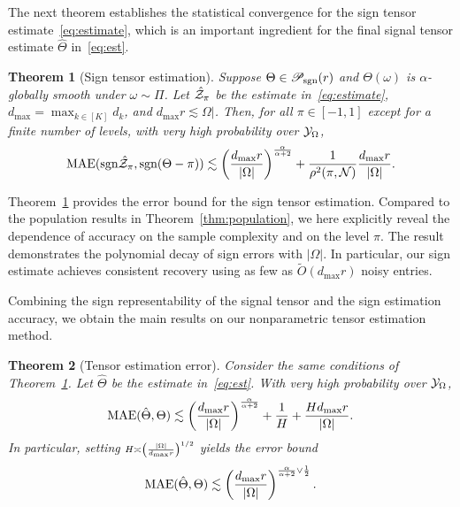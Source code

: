 \documentclass[11pt]{article}
\theoremstyle{plain}
\newtheorem{thm}{Theorem}
\theoremstyle{definition}
\def\sign{\textup{sgn}}
\def\caliP{\mathscr{P}_{\textup{sgn}}}
\begin{document}
The next theorem establishes the statistical convergence for the sign tensor estimate~\eqref{eq:estimate}, which is an important ingredient for the final signal tensor estimate $\hat \Theta$ in~\eqref{eq:est}. \\

 \begin{thm}[Sign tensor estimation]\label{thm:classification} Suppose $\Theta\in\caliP(r)$ and $\Theta(\omega)$ is $\alpha$-globally smooth under $\omega\sim \Pi$. Let $\hat {\mathcal{Z}}_\pi$ be the estimate in~\eqref{eq:estimate}, $d_{\max}=\max_{k\in[K]} d_k$, and $d_{\max}r\lesssim \Omega|$. Then, for all $\pi\in[-1,1]$ except for a finite number of levels, with very high probability over $\mathcal{Y}_\Omega$, 
\begin{align}\label{eq:bound}
\textup{MAE}(\sign \hat \tZ_\pi, \sign(\Theta-\pi)) \lesssim  \left({d_{\max} r\over |\Omega|}\right)^{\alpha\over \alpha+2}+{1 \over \rho^2(\pi, \tN)} {d_{\max}r \over |\Omega|}.
\end{align}
\end{thm}
Theorem~\ref{thm:classification} provides the error bound for the sign tensor estimation. Compared to the population results in Theorem~\ref{thm:population}, we here explicitly reveal the dependence of accuracy on the sample complexity and on the level $\pi$. The result demonstrates the polynomial decay of sign errors with $|\Omega|$. In particular, our sign estimate achieves consistent recovery using as few as $\tilde O(d_{\max}r)$ noisy entries. 

Combining the sign representability of the signal tensor and the sign estimation accuracy, we obtain the main results on our nonparametric tensor estimation method.\\

\begin{thm}[Tensor estimation error]\label{thm:estimation} Consider the same conditions of Theorem~\ref{thm:classification}. Let $\hat \Theta$ be the estimate in~\eqref{eq:est}. With very high probability over $\mathcal{Y}_\Omega$,
\begin{equation}\label{eq:bound2}
\textup{MAE}(\hat \Theta, \Theta)\lesssim \left({d_{\max} r \over |\Omega|}\right)^{\alpha\over\alpha+2}+{1\over H}+{Hd_{\max} r \over |\Omega|}.
\end{equation}
In particular, setting $\scriptstyle H\asymp \left( |\Omega|\over d_{\max}r\right)^{1/2}$ yields the error bound
\begin{equation}\label{eq:real}
\textup{MAE}(\hat \Theta, \Theta)\lesssim \left(d_{\max}r \over |\Omega|\right)^{{\alpha \over \alpha+2} \vee {1\over 2}}.
\end{equation}
\end{thm}
\end{document}
